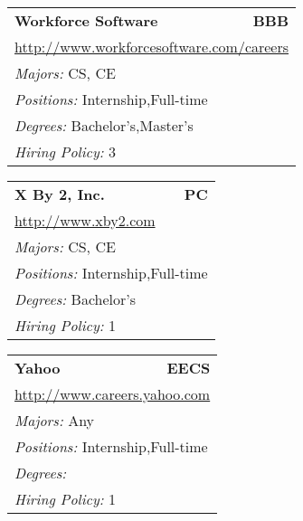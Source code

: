 \documentclass[twoside]{article}
\begin{document}
\begin{center}
\begin{multicols}{3}
\begin{FlushLeft}
\begin{minipage}{\columnwidth}
\end{minipage}
 
\begin{minipage}{\columnwidth}\begin{tabularx}{.95\columnwidth}{Xr}
                 {\Large\bf Workforce Software} & {\Large\bf BBB}\\
    \multicolumn{2}{p{.95\columnwidth}}{\url{http://www.workforcesoftware.com/careers}}\\
    \multicolumn{2}{p{.95\columnwidth}}{\emph{Majors:} CS, CE}\\
    \multicolumn{2}{p{.95\columnwidth}}{\emph{Positions:} Internship,Full-time}\\
    \multicolumn{2}{p{.95\columnwidth}}{\emph{Degrees:} Bachelor's,Master's}\\
    \multicolumn{2}{p{.95\columnwidth}}{\emph{Hiring Policy:} 3}\\
    \end{tabularx}
    
\end{minipage}
 
\begin{minipage}{\columnwidth}\begin{tabularx}{.95\columnwidth}{Xr}
                 {\Large\bf X By 2, Inc.} & {\Large\bf PC}\\
    \multicolumn{2}{p{.95\columnwidth}}{\url{http://www.xby2.com}}\\
    \multicolumn{2}{p{.95\columnwidth}}{\emph{Majors:} CS, CE}\\
    \multicolumn{2}{p{.95\columnwidth}}{\emph{Positions:} Internship,Full-time}\\
    \multicolumn{2}{p{.95\columnwidth}}{\emph{Degrees:} Bachelor's}\\
    \multicolumn{2}{p{.95\columnwidth}}{\emph{Hiring Policy:} 1}\\
    \end{tabularx}
    
\end{minipage}
 
\begin{minipage}{\columnwidth}\begin{tabularx}{.95\columnwidth}{Xr}
                 {\Large\bf Yahoo} & {\Large\bf EECS}\\
    \multicolumn{2}{p{.95\columnwidth}}{\url{http://www.careers.yahoo.com}}\\
    \multicolumn{2}{p{.95\columnwidth}}{\emph{Majors:} Any}\\
    \multicolumn{2}{p{.95\columnwidth}}{\emph{Positions:} Internship,Full-time}\\
    \multicolumn{2}{p{.95\columnwidth}}{\emph{Degrees:} }\\
    \multicolumn{2}{p{.95\columnwidth}}{\emph{Hiring Policy:} 1}\\
    \end{tabularx}
    

\end{minipage}
\end{FlushLeft}
\end{multicols}
\end{center}
\end{document}
